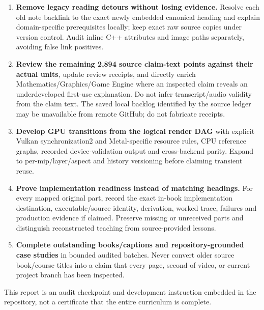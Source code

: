 \begin{enumerate}
\def\labelenumi{\arabic{enumi}.}
\tightlist
\item
  \textbf{Remove legacy reading detours without losing evidence.} Resolve each old note backlink to the exact newly embedded canonical heading and explain domain-specific prerequisites locally; keep exact raw source copies under version control. Audit inline C++ attributes and image paths separately, avoiding false link positives.
\item
  \textbf{Review the remaining 2,894 source claim-text points against their actual units}, update review receipts, and directly enrich Mathematics/Graphics/Game Engine where an inspected claim reveals an underdeveloped first-use explanation. Do not infer transcript/audio validity from the claim text. The saved local backlog identified by the source ledger may be unavailable from remote GitHub; do not fabricate receipts.
\item
  \textbf{Develop GPU transitions from the logical render DAG} with explicit Vulkan synchronization2 and Metal-specific resource rules, CPU reference graphs, recorded device-validation output and cross-backend parity. Expand to per-mip/layer/aspect and history versioning before claiming transient reuse.
\item
  \textbf{Prove implementation readiness instead of matching headings.} For every mapped original part, record the exact in-book implementation destination, executable/source identity, derivation, worked trace, failures and production evidence if claimed. Preserve missing or unreceived parts and distinguish reconstructed teaching from source-provided lessons.
\item
  \textbf{Complete outstanding books/captions and repository-grounded case studies} in bounded audited batches. Never convert older source book/course titles into a claim that every page, second of video, or current project branch has been inspected.
\end{enumerate}

This report is an audit checkpoint and development instruction embedded in the repository, not a certificate that the entire curriculum is complete.
